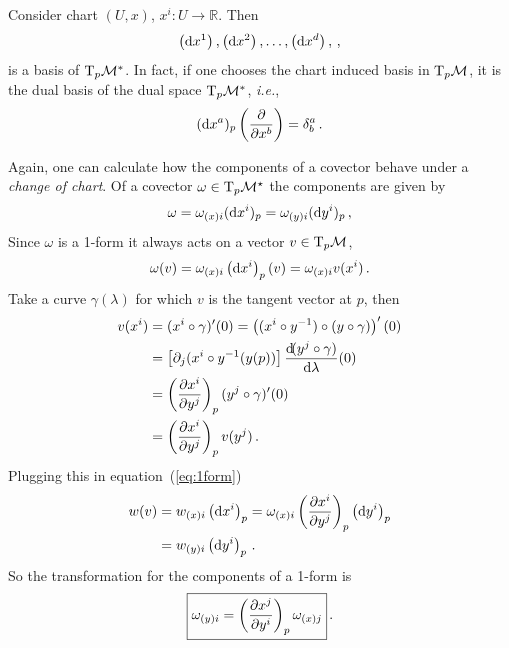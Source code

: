\documentclass[11pt, a4paper, twocolumn]{article} %
\begin{document}
\begin{theorem}
    Consider chart $(U,x)$, $x^i: U \to \mathbb{R}$.
    Then
    \begin{equation}
        \left( \operatorname{d\!} x^1 \right), \left( \operatorname{d\!} x^2 \right), \ldots, \left( \operatorname{d\!} x^d \right),\,,
    \end{equation}
    is a basis of $\T_p\M^*$. In fact, if one chooses the chart induced basis in $\T_p\M$,
    it is the dual basis of the dual space $\T_p\M^*$, \textit{i.e.},
    \begin{equation}
        (\operatorname{d\!} x^a)_p \left( \frac{\partial}{\partial x^b} \right) = \delta^a_b\,.
    \end{equation}
\end{theorem}
Again, one can calculate how the components of a covector behave under a \textit{change of chart}.
Of a covector $\omega \in \T_p\M^\star$ the components are given by
\begin{equation}
    \omega = \omega_{(x)i}(\operatorname{d\!} x^i)_p = \omega_{(y)i}(\operatorname{d\!} y^i)_p\,,
    \label{eq:1form}
\end{equation}
Since $\omega$ is a 1-form it always acts on a vector $v\in \T_p\M$,
\begin{equation}
    \omega(v) = \omega_{(x)i}\left( \operatorname{d\!} x^i \right)_p(v) = \omega_{(x)i}v(x^i)\,.
\end{equation}
Take a curve $\gamma(\lambda)$ for which $v$ is the tangent vector at $p$, then
\begin{align}
    \nonumber v(x^i) &= (x^i\circ \gamma)'(0) = \left( (x^i \circ y^{-1} ) \circ ( y \circ \gamma ) \right)'(0) \\
   \nonumber &= \left[ \partial_j(x^i \circ y^{-1} (y(p)) \right] \frac{\operatorname{d\!}( y^j \circ \gamma)}{\operatorname{d\!} \lambda}(0) \\
      \nonumber  &= \left( \frac{\partial x^i}{\partial y^j} \right)_p (y^j \circ \gamma)'(0)\\
        &= \left( \frac{\partial x^i}{\partial y^j} \right)_p v(y^j)\,.
\end{align}
Plugging this in equation~(\ref{eq:1form})
\begin{align}
    w(v) &= w_{(x)i}\left( \operatorname{d\!} x^i \right)_p = \omega_{(x)i} \left( \frac{\partial x^i}{\partial y^j} \right)_p \left( \operatorname{d\!} y^i \right)_p\nonumber \\
    &= w_{(y)i}\left( \operatorname{d\!} y^i \right)_p\,.
\end{align}
So the transformation for the components of a 1-form is
\begin{equation}
    \boxed{%
        \omega_{(y)i} = \left( \frac{\partial x^j}{\partial y^i} \right)_p \omega_{(x)j}
}\,.
\end{equation}
\end{document}
